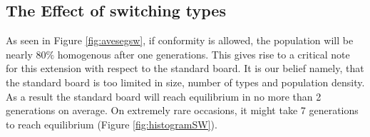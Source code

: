 \subsection{The Effect of switching types}
As seen in Figure \ref{fig:avesegsw}, if conformity is allowed, the population will be nearly \(80\%\) homogenous after one generations. 
This gives rise to a critical note for this extension with respect to the standard board. It is our belief namely, that the standard board is too limited in size, number of types and population density. 
As a result the standard board will reach equilibrium in no more than 2 generations on average. On extremely rare occasions, it might take 7 generations to reach equilibrium (Figure  \ref{fig:histogramSW}). 

  